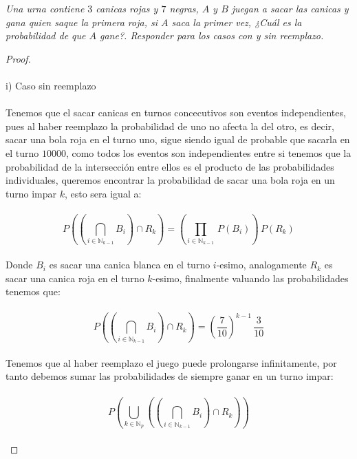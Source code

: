 \documentclass[11pt,letterpaper]{article}
\newcommand{\N}{\mathbb{N}}
\begin{document}
\begin{tcolorbox}[
	title = \textcolor{black}{\textcolor{white}{Problema 6}},]
\textit{Una urna contiene $3$ canicas rojas y $7$ negras, $A$ y $B$ juegan a sacar las
canicas y gana quien saque la primera roja, si $A$ saca la primer vez, ¿Cuál
es la probabilidad de que $A$ gane?. Responder para los casos con y sin
reemplazo.
}
\end{tcolorbox}
\begin{proof}\,\\
    \,\\
    i)\,\,Caso sin reemplazo\,\\
    \,\\
    Tenemos que el sacar canicas en turnos concecutivos son eventos independientes, pues al haber reemplazo la probabilidad de uno no afecta la del otro, es decir, sacar una bola roja en el turno uno, sigue siendo igual de probable que
    sacarla en el turno $10000$, como todos los eventos son independientes entre si tenemos que la probabilidad de la intersecci\'on entre ellos es el producto de las probabilidades individuales, queremos encontrar la probabilidad de sacar una bola roja en un turno impar $k$, esto sera igual a:\,\\
    \,\\
    \begin{equation*}
        P\left(\left(\bigcap_{i\in \N_{k-1}}B_i\right)\cap R_k \right)=\left(\prod_{i\in \N_{k-1}}\,P(B_i)\right)\,P(R_k)
    \end{equation*}\,\\
    Donde $B_i$ es sacar una canica blanca en el turno $i$-esimo, analogamente $R_k$ es sacar una canica roja en el turno $k$-esimo, finalmente valuando las probabilidades tenemos que:\,\\
    \,\\
    \begin{equation*}
        P\left(\left(\bigcap_{i\in \N_{k-1}}B_i\right)\cap R_k \right)=\left(\frac{7}{10}\right)^{k-1}\,\frac{3}{10}
    \end{equation*}\,\\
    Tenemos que al haber reemplazo el juego puede prolongarse infinitamente, por tanto debemos sumar las probabilidades de siempre ganar en un turno impar:\,\\
    \,\\
    \begin{equation*}
        P\left(\bigcup_{k\in \N_p}\left(\left(\bigcap_{i\in \N_{k-1}}B_i\right)\cap R_k\right) \right)
    \end{equation*}\,\\

\end{proof}
\end{document}
